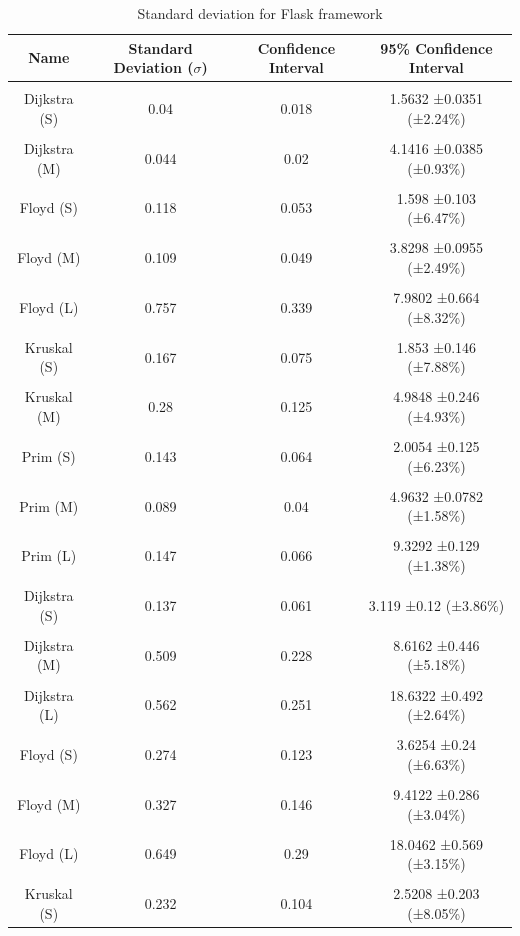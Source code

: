 \bigskip
\begin{table}[h!]
\centering
\begin{tabular}{||c c c c||} 
\hline
Name & Standard Deviation ($\sigma$) & Confidence Interval & 95\% Confidence Interval \\ [1ex] 
\hline\hline
 & & & \\
Dijkstra (S) & 0.04 & 0.018 & 1.5632 ±0.0351 (±2.24\%) \\
 & & & \\
Dijkstra (M) & 0.044 & 0.02 & 4.1416 ±0.0385 (±0.93\%) \\
 & & & \\
Floyd (S) & 0.118 & 0.053 & 1.598 ±0.103 (±6.47\%) \\
 & & & \\
Floyd (M) & 0.109 & 0.049 & 3.8298 ±0.0955 (±2.49\%) \\
 & & & \\
Floyd (L) & 0.757 & 0.339 & 7.9802 ±0.664 (±8.32\%) \\
 & & & \\
Kruskal (S) & 0.167 & 0.075 & 1.853 ±0.146 (±7.88\%) \\
 & & & \\
Kruskal (M) & 0.28 & 0.125 & 4.9848 ±0.246 (±4.93\%) \\
 & & & \\
Prim (S) & 0.143 & 0.064 & 2.0054 ±0.125 (±6.23\%) \\
 & & & \\
Prim (M) & 0.089 & 0.04 & 4.9632 ±0.0782 (±1.58\%) \\
 & & & \\
Prim (L) & 0.147 & 0.066 & 9.3292 ±0.129 (±1.38\%) \\
 & & & \\
Dijkstra (S) & 0.137 & 0.061 & 3.119 ±0.12 (±3.86\%) \\
 & & & \\
Dijkstra (M) & 0.509 & 0.228 & 8.6162 ±0.446 (±5.18\%) \\
 & & & \\
Dijkstra (L) & 0.562 & 0.251 & 18.6322 ±0.492 (±2.64\%) \\
 & & & \\
Floyd (S) & 0.274 & 0.123 & 3.6254 ±0.24 (±6.63\%) \\
 & & & \\
Floyd (M) & 0.327 & 0.146 & 9.4122 ±0.286 (±3.04\%) \\
 & & & \\
Floyd (L) & 0.649 & 0.29 & 18.0462 ±0.569 (±3.15\%) \\
 & & & \\
Kruskal (S) & 0.232 & 0.104 & 2.5208 ±0.203 (±8.05\%) \\ [1ex]
\hline
\end{tabular}
\caption{Standard deviation for Flask framework}
\label{table:time_complexity_2}
\end{table}
\bigskip

